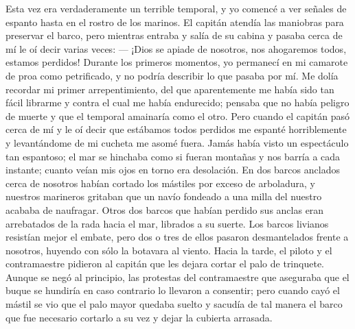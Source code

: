 \documentclass{novela}
\begin{document}
    Esta vez era verdaderamente un terrible temporal, y yo comencé a ver señales de espanto hasta en el rostro de los marinos. El capitán atendía las maniobras para preservar el barco, pero mientras entraba y salía de su cabina y pasaba cerca de mí le oí decir varias veces:
    — ¡Dios se apiade de nosotros, nos ahogaremos todos, estamos perdidos!
    Durante los primeros momentos, yo permanecí en mi camarote de proa como petrificado, y no podría describir lo que pasaba por mí. Me dolía recordar mi primer arrepentimiento, del que aparentemente me había sido tan fácil librarme y contra el cual me había endurecido; pensaba que no había peligro de muerte y que el temporal amainaría como el otro. Pero cuando el capitán pasó cerca de mí y le oí decir que estábamos todos perdidos me espanté horriblemente y levantándome de mi cucheta me asomé fuera. Jamás había visto un espectáculo tan espantoso; el mar se hinchaba como si fueran montañas y nos barría a cada instante; cuanto veían mis ojos en torno era desolación. En dos barcos anclados cerca de nosotros habían cortado los mástiles por exceso de arboladura, y nuestros marineros gritaban que un navío fondeado a una milla del nuestro acababa de naufragar. Otros dos barcos que habían perdido sus anclas eran arrebatados de la rada hacia el mar, librados a su suerte. Los barcos livianos resistían mejor el embate, pero dos o tres de ellos pasaron desmantelados frente a nosotros, huyendo con sólo la botavara al viento.
    Hacia la tarde, el piloto y el contramaestre pidieron al capitán que les dejara cortar el palo de trinquete. Aunque se negó al principio, las protestas del contramaestre que aseguraba que el buque se hundiría en caso contrario lo llevaron a consentir; pero cuando cayó el mástil se vio que el palo mayor quedaba suelto y sacudía de tal manera el barco que fue necesario cortarlo a su vez y dejar la cubierta arrasada.
\end{document}
